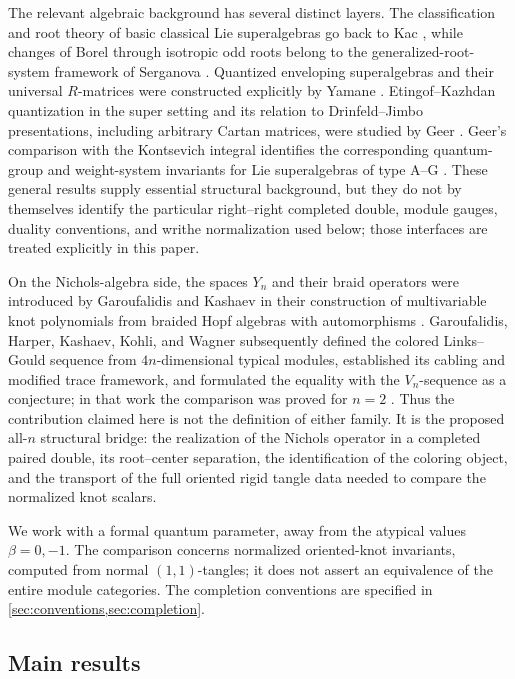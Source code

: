\documentclass[11pt,a4paper]{article}
\theoremstyle{definition}
\theoremstyle{remark}
\begin{document}
The relevant algebraic background has several distinct layers.  The
classification and root theory of basic classical Lie superalgebras go
back to Kac \cite{Kac}, while changes of Borel through isotropic odd roots
belong to the generalized-root-system framework of Serganova
\cite{Serganova}.  Quantized enveloping superalgebras and their universal
\(R\)-matrices were constructed explicitly by Yamane \cite{Yamane}.
Etingof--Kazhdan quantization in the super setting and its relation to
Drinfeld--Jimbo presentations, including arbitrary Cartan matrices, were
studied by Geer \cite{GeerEK,GeerCartan}.  Geer's comparison with the
Kontsevich integral identifies the corresponding quantum-group and
weight-system invariants for Lie superalgebras of type A--G
\cite{GeerKontsevich}.  These general results supply essential structural
background, but they do not by themselves identify the particular
right--right completed double, module gauges, duality conventions, and
writhe normalization used below; those interfaces are treated explicitly
in this paper.

On the Nichols-algebra side, the spaces \(Y_n\) and their braid operators
were introduced by Garoufalidis and Kashaev in their construction of
multivariable knot polynomials from braided Hopf algebras with
automorphisms \cite{GK}.  Garoufalidis, Harper, Kashaev, Kohli, and Wagner
subsequently defined the colored Links--Gould sequence from
\(4n\)-dimensional typical modules, established its cabling and modified
trace framework, and formulated the equality with the \(V_n\)-sequence as
a conjecture; in that work the comparison was proved for \(n=2\)
\cite[Conjecture~1.4 and Theorem~1.5]{ColoredLG}.  Thus the contribution
claimed here is not the definition of either family.  It is the proposed
all-\(n\) structural bridge: the realization of the Nichols operator in a
completed paired double, its root--center separation, the identification
of the coloring object, and the transport of the full oriented rigid
tangle data needed to compare the normalized knot scalars.

We work with a formal quantum parameter, away from the atypical values
\(\beta=0,-1\).  The comparison concerns normalized oriented-knot
invariants, computed from normal \((1,1)\)-tangles; it does not assert an
equivalence of the entire module categories.  The completion conventions
are specified in \cref{sec:conventions,sec:completion}.

\subsection{Main results}
\end{document}
